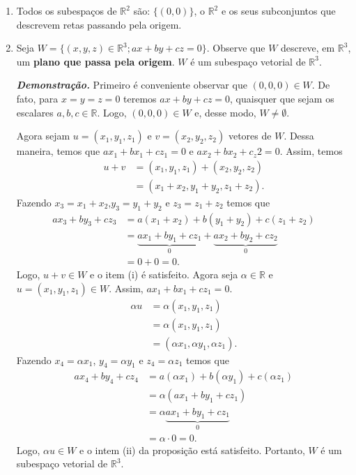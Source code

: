 \begin{enumerate}
\item Todos os subespaços de $\mathbb{R}^2$ são:  $\{(0,0)\}$, o  $\mathbb{R}^2$  e os seus subconjuntos que descrevem  retas passando pela origem.

\item Seja $W=\{(x,y,z) \in \mathbb{R}^3; ax+by+cz=0\}$.  Observe que $W$ descreve, em $\mathbb{R}^3$, um \textbf{plano que passa pela origem}.  $W$ é um subespaço vetorial de $\mathbb{R}^3$.

\textbf{\textit{Demonstração.}}
  Primeiro é conveniente observar que $(0,0,0) \in W$. De fato, para $x=y=z=0$ teremos $ax+by+cz=0$, quaisquer que sejam os escalares  $a,b,c \in \mathbb{R}$. Logo, $(0,0,0) \in W$ e, desse modo, $W \neq \emptyset$.

Agora sejam $u=(x_1, y_1, z_1)$ e $v=(x_2, y_2, z_2)$ vetores de $W$.  Dessa maneira,  temos que $ax_1+bx_1+cz_1=0$ e  $ax_2+bx_2+c_z2=0$. Assim,  temos
\begin{align*}
u+v &=(x_1, y_1, z_1)+(x_2, y_2, z_2)\\
       &=(x_1+x_2, y_1+y_2, z_1+z_2).
\end{align*}
Fazendo $x_3=x_1+x_2$,$y_3=y_1+y_2$ e $z_3=z_1+z_2$ temos que
\begin{align*}
ax_3+by_3+cz_3&=a(x_1+x_2)+b(y_1+y_2)+c(z_1+z_2)\\
                             &=\underbrace{ax_1+by_1+cz_1}_{0}+\underbrace{ax_2+by_2+cz_2}_{0}\\
                             &=0+0=0.
\end{align*}
Logo, $u+v  \in W$ e o item (i) é satisfeito.  Agora seja  $\alpha \in \mathbb{R}$ e $u=(x_1, y_1, z_1) \in W$. Assim, $ax_1+bx_1+cz_1=0$.
\begin{align*}
\alpha u &=\alpha(x_1,y_1, z_1)\\
            &=\alpha (x_1,y_1, z_1) \\
       &=(\alpha x_1, \alpha y_1, \alpha z_1).
\end{align*}
 Fazendo $x_4=\alpha x_1$, $y_4=\alpha y_1$ e  $z_4=\alpha z_1$ temos que
\begin{align*}
ax_4+by_4+cz_4&=a(\alpha x_1)+b(\alpha y_1)+c(\alpha z_1)\\
                              &=\alpha ( ax_1 +b y_1+cz_1)\\
                             &=\alpha\underbrace{ax_1+by_1+cz_1}_{0}\\
                             &=\alpha \cdot 0=0.
\end{align*}
Logo, $\alpha u \in W$ e o intem (ii) da proposição está satisfeito.  Portanto, $W$ é um subespaço vetorial de $\mathbb{R}^3$.



\end{enumerate}
